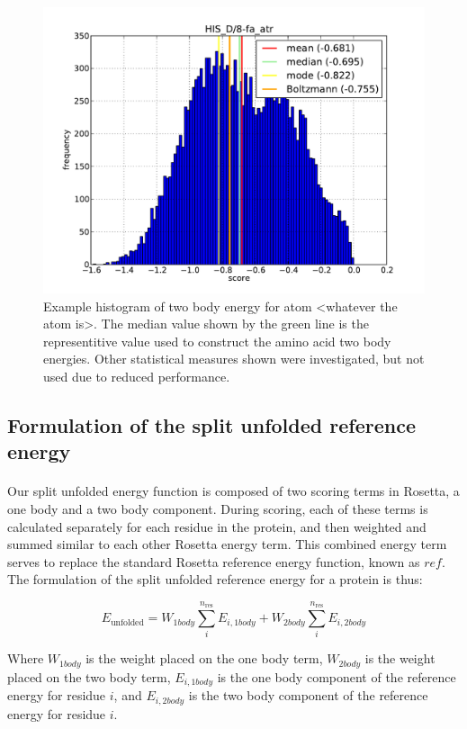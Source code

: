 \begin{figure}
  \includegraphics[width=\linewidth]{Figures/test.png}
  \caption{Example histogram of two body energy for atom <whatever the atom is>. The median value shown by the green line is the representitive value used to construct the amino acid two body energies. Other statistical measures shown were investigated, but not used due to reduced performance.}
  \label{fig:tbaedist}
\end{figure}


\subsection{Formulation of the split unfolded reference energy}
\paragraph{}
Our split unfolded energy function is composed of two scoring terms in Rosetta, a one body and a two body component.
During scoring, each of these terms is calculated separately for each residue in the protein, and then weighted and summed similar to each other Rosetta energy term.
This combined energy term serves to replace the standard Rosetta reference energy function, known as $ref$.
The formulation of the split unfolded reference energy for a protein is thus:

\begin{equation}
E_{\text{unfolded}} =  W_{1body} \sum_{i}^{n_{\text{res}}} E_{i,1body} +  W_{2body} \sum_{i}^{n_{\text{res}}} E_{i,2body}
\end{equation}

Where $W_{1body}$ is the weight placed on the one body term, $W_{2body}$ is the weight placed on the two body term, $E_{i,1body}$ is the one body component of the reference energy for residue $i$, and $E_{i,2body}$ is the two body component of the reference energy for residue $i$.

